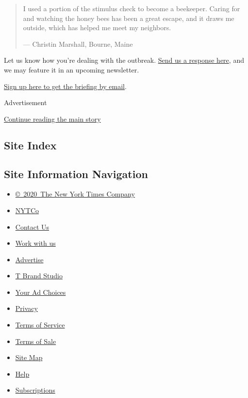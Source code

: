 \begin{quote}
I used a portion of the stimulus check to become a beekeeper. Caring for
and watching the honey bees has been a great escape, and it draws me
outside, which has helped me meet my neighbors.

--- Christin Marshall, Bourne, Maine
\end{quote}

Let us know how you're dealing with the outbreak.
\href{https://www.nytimes.com/2020/03/02/reader-center/coronavirus-preparation.html}{Send
us a response here}, and we may feature it in an upcoming newsletter.

\href{https://www.nytimes.com/newsletters/coronavirus-briefing}{Sign up
here to get the briefing by email}.

Advertisement

\protect\hyperlink{after-bottom}{Continue reading the main story}

\hypertarget{site-index}{%
\subsection{Site Index}\label{site-index}}

\hypertarget{site-information-navigation}{%
\subsection{Site Information
Navigation}\label{site-information-navigation}}

\begin{itemize}
\tightlist
\item
  \href{https://help.nytimes.com/hc/en-us/articles/115014792127-Copyright-notice}{©~2020~The
  New York Times Company}
\end{itemize}

\begin{itemize}
\tightlist
\item
  \href{https://www.nytco.com/}{NYTCo}
\item
  \href{https://help.nytimes.com/hc/en-us/articles/115015385887-Contact-Us}{Contact
  Us}
\item
  \href{https://www.nytco.com/careers/}{Work with us}
\item
  \href{https://nytmediakit.com/}{Advertise}
\item
  \href{http://www.tbrandstudio.com/}{T Brand Studio}
\item
  \href{https://www.nytimes.com/privacy/cookie-policy\#how-do-i-manage-trackers}{Your
  Ad Choices}
\item
  \href{https://www.nytimes.com/privacy}{Privacy}
\item
  \href{https://help.nytimes.com/hc/en-us/articles/115014893428-Terms-of-service}{Terms
  of Service}
\item
  \href{https://help.nytimes.com/hc/en-us/articles/115014893968-Terms-of-sale}{Terms
  of Sale}
\item
  \href{https://spiderbites.nytimes.com}{Site Map}
\item
  \href{https://help.nytimes.com/hc/en-us}{Help}
\item
  \href{https://www.nytimes.com/subscription?campaignId=37WXW}{Subscriptions}
\end{itemize}
